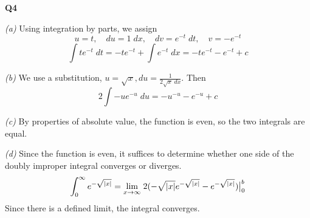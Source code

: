 \documentclass[12pt, a4paper]{article}
\begin{document}
\textbf{Q4}

\textit{(a)}
Using integration by parts, we assign
\[
    u = t, \quad du = 1\;dx, \quad dv = e^{-t}\;dt, \quad v = -e^{-t}
\]
\[
    \int te^{-t}\;dt = -te^{-t} + \int e^{-t}\;dx =
    -te^{-t} -e^{-t} + c
\]

\textit{(b)}
We use a substitution, $u = \sqrt{x}, du = \frac{1}{2\sqrt{x}\;dx}$.
Then
\[
    2\int -ue^{-u} \;du = -u^{-u} - e^{-u} + c
\]

\textit{(c)}
By properties of absolute value, the function is even,
so the two integrals are equal.

\textit{(d)}
Since the function is even, it suffices to determine whether
one side of the doubly improper integral converges or diverges.
\[
    \int_0^\infty e^{-\sqrt{|x|}}
    = \displaystyle{\lim_{x \to \infty}\;} 2(-\sqrt{|x|}e^{-\sqrt{|x|}} - e^{-\sqrt{|x|}})\big\vert_0^b
\]
Since there is a defined limit, the integral converges.
\end{document}
